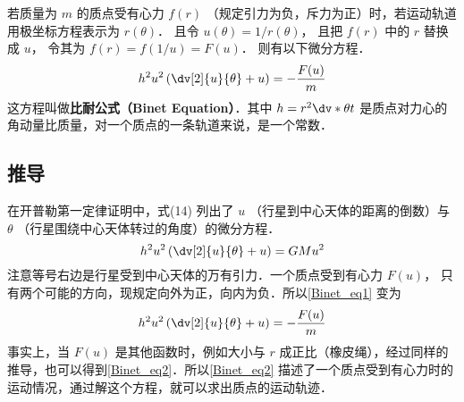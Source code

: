 

若质量为 $m$ 的质点受有心力 $f(r)$ （规定引力为负，斥力为正）时，若运动轨道用极坐标方程表示为 $r(\theta)$． 且令 $u(\theta) = 1/r(\theta)$， 且把 $f(r)$ 中的 $r$ 替换成 $u$， 令其为
 $f(r) = f(1/u) = F(u)$． 则有以下微分方程．
 \begin{equation}
{h^2}{u^2}\left( \dv[2]{u}{\theta} + u \right) = -\frac{F(u)}{m}
\end{equation} 
这方程叫做\textbf{比耐公式（Binet Equation）}．其中 $h = {r^2} \dv*{\theta}{t}$ 是质点对力心的角动量比质量，对一个质点的一条轨道来说，是一个常数．

\subsection{推导}
在开普勒第一定律证明中，式(14)%
列出了 $u$ （行星到中心天体的距离的倒数）与 $\theta $ （行星围绕中心天体转过的角度）的微分方程． 
\begin{equation}\label{Binet_eq1}
{h^2}{u^2}\left( \dv[2]{u}{\theta} + u \right) =  GMu^2
\end{equation} 
注意等号右边是行星受到中心天体的万有引力．一个质点受到有心力%
 $F(u)$， 只有两个可能的方向，现规定向外为正，向内为负．所以\autoref{Binet_eq1} 变为
\begin{equation}\label{Binet_eq2}
{h^2}{u^2}\left( \dv[2]{u}{\theta} + u \right) = -\frac{F(u)}{m}
\end{equation} 
事实上，当 $F(u)$ 是其他函数时，例如大小与 $r$ 成正比（橡皮绳），经过同样的推导，也可以得到\autoref{Binet_eq2}．所以\autoref{Binet_eq2} 描述了一个质点受到有心力时的运动情况，通过解这个方程，就可以求出质点的运动轨迹．














